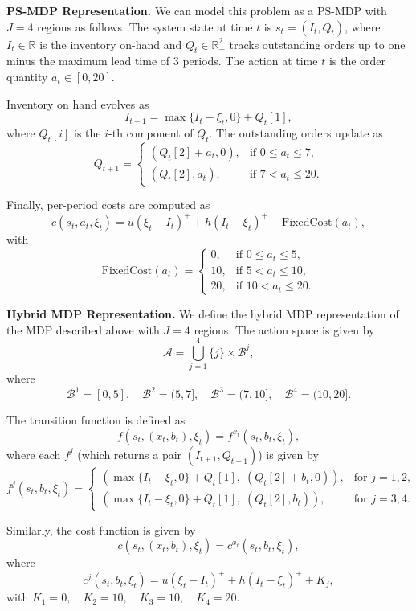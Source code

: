 \documentclass{article}
\theoremstyle{definition}
\theoremstyle{remark}
\begin{document}
\textbf{PS-MDP Representation.} We can model this problem as a PS-MDP with $J=4$ regions as follows.
The system state at time $t$ is $s_t = (I_t, Q_t)$,
where $I_t \in \mathbb{R}$ is the inventory on-hand and $Q_t \in \mathbb{R}_+^2$ tracks outstanding orders up to one minus the maximum lead time of $3$ periods.  
The action at time $t$ is the order quantity $a_t \in [0, 20]$.

Inventory on hand evolves as
\[
I_{t+1} = \max\{I_t - \xi_t, 0\} + Q_t[1],
\]
where $Q_t[i]$ is the $i$-th component of $Q_t$.
The outstanding orders update as
\[
Q_{t+1} = 
\begin{cases}
(Q_t[2] + a_t, 0), & \text{if } 0 \leq a_t \leq 7, \\
(Q_t[2], a_t), & \text{if } 7 < a_t \leq 20.
\end{cases}
\]

Finally, per-period costs are computed as
\[
c(s_t, a_t, \xi_t) = u(\xi_t - I_t)^+ + h(I_t - \xi_t)^+ + \text{FixedCost}(a_t),
\]
with
\[
\text{FixedCost}(a_t) =
\begin{cases}
0, & \text{if } 0 \leq a_t \leq 5, \\
10, & \text{if } 5 < a_t \leq 10, \\
20, & \text{if } 10 < a_t \leq 20.
\end{cases}
\]

\textbf{Hybrid MDP Representation.} We define the hybrid MDP representation of the MDP described above with $J=4$ regions.  
The action space is given by
\[
\mathcal{A} = \bigcup_{j=1}^4\{j\} \times \mathcal{B}^j,
\]
where
\[
\mathcal{B}^1 = [0,5],\quad
\mathcal{B}^2 = (5,7],\quad
\mathcal{B}^3 = (7,10],\quad
\mathcal{B}^4 = (10,20].
\]

The transition function is defined as
\[
f(s_t, (x_t, b_t), \xi_t) = f^{x_t}(s_t, b_t, \xi_t),
\]
where each $f^j$ (which returns a pair $(I_{t+1}, Q_{t+1})$) is given by
\[
f^j(s_t, b_t, \xi_t) =
\begin{cases}
\left( \max\{I_t - \xi_t, 0\} + Q_t[1],\; (Q_t[2] + b_t, 0) \right), & \text{for } j=1,2, \\[6pt]
\left( \max\{I_t - \xi_t, 0\} + Q_t[1],\; (Q_t[2], b_t) \right), & \text{for } j=3,4.
\end{cases}
\]

Similarly, the cost function is given by
\[
c(s_t, (x_t, b_t), \xi_t) = c^{x_t}(s_t, b_t, \xi_t),
\]
where
\[
c^j(s_t, b_t, \xi_t)
=
u(\xi_t - I_t)^+ + h(I_t - \xi_t)^+ + K_j,
\]
with $K_1 = 0,\quad K_2 = 10,\quad K_3 = 10,\quad K_4 = 20$.
\end{document}
